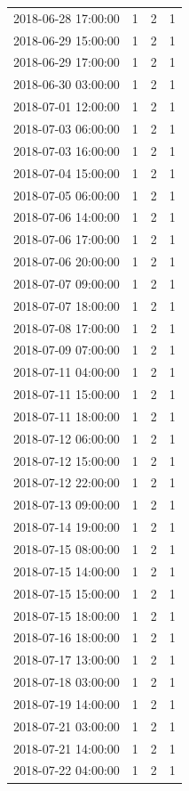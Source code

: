 \begin{tabular}{lrrr}
2018-06-28 17:00:00 & 1 & 2 & 1 \\
2018-06-29 15:00:00 & 1 & 2 & 1 \\
2018-06-29 17:00:00 & 1 & 2 & 1 \\
2018-06-30 03:00:00 & 1 & 2 & 1 \\
2018-07-01 12:00:00 & 1 & 2 & 1 \\
2018-07-03 06:00:00 & 1 & 2 & 1 \\
2018-07-03 16:00:00 & 1 & 2 & 1 \\
2018-07-04 15:00:00 & 1 & 2 & 1 \\
2018-07-05 06:00:00 & 1 & 2 & 1 \\
2018-07-06 14:00:00 & 1 & 2 & 1 \\
2018-07-06 17:00:00 & 1 & 2 & 1 \\
2018-07-06 20:00:00 & 1 & 2 & 1 \\
2018-07-07 09:00:00 & 1 & 2 & 1 \\
2018-07-07 18:00:00 & 1 & 2 & 1 \\
2018-07-08 17:00:00 & 1 & 2 & 1 \\
2018-07-09 07:00:00 & 1 & 2 & 1 \\
2018-07-11 04:00:00 & 1 & 2 & 1 \\
2018-07-11 15:00:00 & 1 & 2 & 1 \\
2018-07-11 18:00:00 & 1 & 2 & 1 \\
2018-07-12 06:00:00 & 1 & 2 & 1 \\
2018-07-12 15:00:00 & 1 & 2 & 1 \\
2018-07-12 22:00:00 & 1 & 2 & 1 \\
2018-07-13 09:00:00 & 1 & 2 & 1 \\
2018-07-14 19:00:00 & 1 & 2 & 1 \\
2018-07-15 08:00:00 & 1 & 2 & 1 \\
2018-07-15 14:00:00 & 1 & 2 & 1 \\
2018-07-15 15:00:00 & 1 & 2 & 1 \\
2018-07-15 18:00:00 & 1 & 2 & 1 \\
2018-07-16 18:00:00 & 1 & 2 & 1 \\
2018-07-17 13:00:00 & 1 & 2 & 1 \\
2018-07-18 03:00:00 & 1 & 2 & 1 \\
2018-07-19 14:00:00 & 1 & 2 & 1 \\
2018-07-21 03:00:00 & 1 & 2 & 1 \\
2018-07-21 14:00:00 & 1 & 2 & 1 \\
2018-07-22 04:00:00 & 1 & 2 & 1 \\

\end{tabular}

